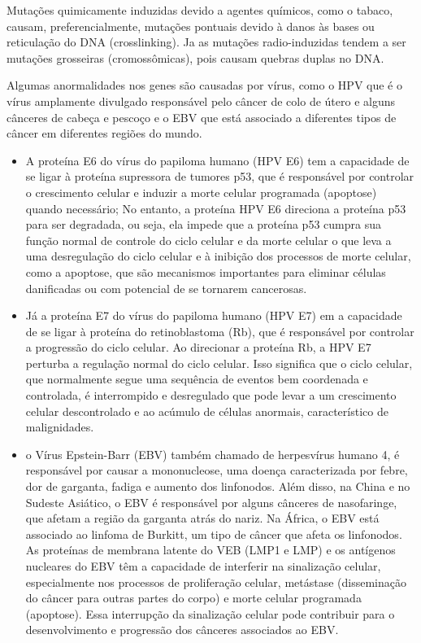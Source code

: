 \documentclass[11pt,a4paper]{article}
\begin{document}
    Mutações quimicamente induzidas devido a agentes químicos, como o tabaco, causam, preferencialmente, mutações pontuais devido à danos às bases ou reticulação do DNA (crosslinking). Ja as mutações radio-induzidas tendem a ser mutações grosseiras (cromossômicas), pois causam quebras duplas no DNA.

    Algumas anormalidades nos genes são causadas por vírus, como o HPV que é o vírus amplamente divulgado responsável pelo câncer de colo de útero e alguns cânceres de cabeça e pescoço e o EBV que está associado a diferentes tipos de câncer em diferentes regiões do mundo. 
    
    \begin{itemize}[label=\textcolor{CarnationPink}{$\blacktriangleright$}]
        \item A proteína E6 do vírus do papiloma humano (HPV E6) tem a capacidade de se ligar à proteína supressora de tumores p53, que é responsável por controlar o crescimento celular e induzir a morte celular programada (apoptose) quando necessário; No entanto, a proteína HPV E6 direciona a proteína p53 para ser degradada, ou seja, ela impede que a proteína p53 cumpra sua função normal de controle do ciclo celular e da morte celular o que leva a uma desregulação do ciclo celular e à inibição dos processos de morte celular, como a apoptose, que são mecanismos importantes para eliminar células danificadas ou com potencial de se tornarem cancerosas.
        \item Já a proteína E7 do vírus do papiloma humano (HPV E7) em a capacidade de se ligar à proteína do retinoblastoma (Rb), que é responsável por controlar a progressão do ciclo celular. Ao direcionar a proteína Rb, a HPV E7 perturba a regulação normal do ciclo celular. Isso significa que o ciclo celular, que normalmente segue uma sequência de eventos bem coordenada e controlada, é interrompido e desregulado que pode levar a um crescimento celular descontrolado e ao acúmulo de células anormais, característico de malignidades.
        \item o Vírus Epstein-Barr (EBV) também chamado de herpesvírus humano 4, é responsável por causar a mononucleose, uma doença caracterizada por febre, dor de garganta, fadiga e aumento dos linfonodos. Além disso, na China e no Sudeste Asiático, o EBV é responsável por alguns cânceres de nasofaringe, que afetam a região da garganta atrás do nariz. Na África, o EBV está associado ao linfoma de Burkitt, um tipo de câncer que afeta os linfonodos. As proteínas de membrana latente do VEB (LMP1 e LMP) e os antígenos nucleares do EBV têm a capacidade de interferir na sinalização celular, especialmente nos processos de proliferação celular, metástase (disseminação do câncer para outras partes do corpo) e morte celular programada (apoptose). Essa interrupção da sinalização celular pode contribuir para o desenvolvimento e progressão dos cânceres associados ao EBV.
    \end{itemize}
\end{document}
